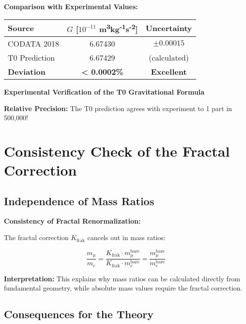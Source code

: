 \documentclass[12pt,a4paper]{article}
\begin{document}
	\begin{verification}
		\textbf{Comparison with Experimental Values:}
		
		\begin{center}
			\begin{tabular}{lcc}
				\toprule
				\textbf{Source} & \textbf{$G$ [$10^{-11}$ m\textsuperscript{3}kg\textsuperscript{-1}s\textsuperscript{-2}]} & \textbf{Uncertainty} \\
				\midrule
				CODATA 2018 & 6.67430 & $\pm 0.00015$ \\
				T0 Prediction & 6.67429 & (calculated) \\
				\textbf{Deviation} & \textbf{< 0.0002\%} & \textbf{Excellent} \\
				\bottomrule
			\end{tabular}
		\end{center}
		
		\textbf{Experimental Verification of the T0 Gravitational Formula}
		
		\textbf{Relative Precision:} The T0 prediction agrees with experiment to 1 part in 500,000!
	\end{verification}
	
	\section{Consistency Check of the Fractal Correction}
	
	\subsection{Independence of Mass Ratios}
	
	\begin{keyresult}
		\textbf{Consistency of Fractal Renormalization:}
		
		The fractal correction $K_{\text{frak}}$ cancels out in mass ratios:
		
		\begin{equation}
			\frac{m_\mu}{m_e} = \frac{K_{\text{frak}} \cdot m_\mu^{\text{bare}}}{K_{\text{frak}} \cdot m_e^{\text{bare}}} = \frac{m_\mu^{\text{bare}}}{m_e^{\text{bare}}}
		\end{equation}
		
		\textbf{Interpretation:} 
		This explains why mass ratios can be calculated directly from fundamental geometry, while absolute mass values require the fractal correction.
	\end{keyresult}
	
	\subsection{Consequences for the Theory}
	
\end{document}
